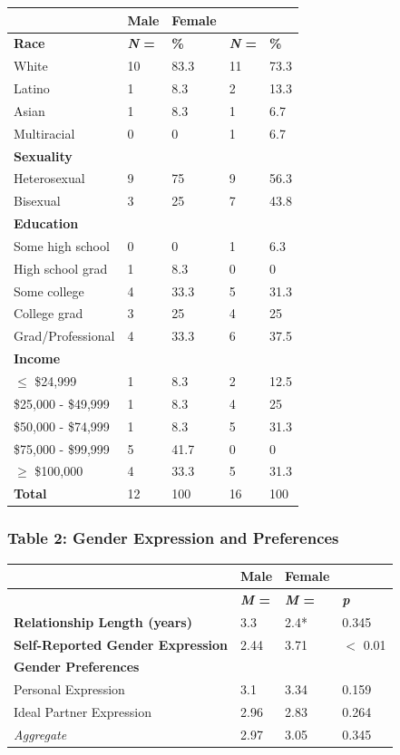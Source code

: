 \documentclass[twoside]{report}
\begin{document}
\begin{longtable}[]{@{}lllll@{}}
\toprule
& \textbf{Male} & \textbf{Female} & &\tabularnewline
\midrule
\endhead
\textbf{Race} & \textbf{\emph{N} =} & \textbf{\%} & \textbf{\emph{N} =}
& \textbf{\%}\tabularnewline
White & 10 & 83.3 & 11 & 73.3\tabularnewline
Latino & 1 & 8.3 & 2 & 13.3\tabularnewline
Asian & 1 & 8.3 & 1 & 6.7\tabularnewline
Multiracial & 0 & 0 & 1 & 6.7\tabularnewline
\textbf{Sexuality} & & & &\tabularnewline
Heterosexual & 9 & 75 & 9 & 56.3\tabularnewline
Bisexual & 3 & 25 & 7 & 43.8\tabularnewline
\textbf{Education} & & & &\tabularnewline
Some high school & 0 & 0 & 1 & 6.3\tabularnewline
High school grad & 1 & 8.3 & 0 & 0\tabularnewline
Some college & 4 & 33.3 & 5 & 31.3\tabularnewline
College grad & 3 & 25 & 4 & 25\tabularnewline
Grad/Professional & 4 & 33.3 & 6 & 37.5\tabularnewline
\textbf{Income} & & & &\tabularnewline
$\leq$ \$24,999 & 1 & 8.3 & 2 & 12.5\tabularnewline
\$25,000 - \$49,999 & 1 & 8.3 & 4 & 25\tabularnewline
\$50,000 - \$74,999 & 1 & 8.3 & 5 & 31.3\tabularnewline
\$75,000 - \$99,999 & 5 & 41.7 & 0 & 0\tabularnewline
$\geq$ \$100,000 & 4 & 33.3 & 5 & 31.3\tabularnewline
\textbf{Total} & 12 & 100 & 16 & 100\tabularnewline
\bottomrule
\end{longtable}

\hypertarget{table-2}{\subsubsection[Table 2: Gender Expression \\and
Preferences]{Table 2: Gender Expression and
Preferences}}

\begin{longtable}[]{@{}llll@{}}
\toprule
& \textbf{Male} & \textbf{Female} &\tabularnewline
\midrule
\endhead
& \textbf{\emph{M} =} & \textbf{\emph{M} =~} &
\emph{\textbf{p}}\tabularnewline
\textbf{Relationship Length (years)} & 3.3 & 2.4* & 0.345\tabularnewline
\textbf{Self-Reported Gender Expression} & 2.44 & 3.71 & $<$ 0.01\tabularnewline
\textbf{Gender Preferences} & & &\tabularnewline
Personal Expression & 3.1 & 3.34 & 0.159\tabularnewline
Ideal Partner Expression & 2.96 & 2.83 & 0.264\tabularnewline
\emph{Aggregate} & 2.97 & 3.05 & 0.345\tabularnewline
\bottomrule
\end{longtable}
\end{document}
